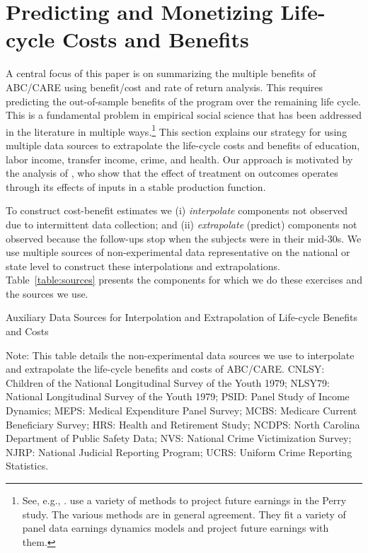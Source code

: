 \section{Predicting and Monetizing Life-cycle Costs and Benefits}\label{section:cbamethodology}

A central focus of this paper is on summarizing the multiple benefits of ABC/CARE using benefit/cost and rate of return analysis. This requires predicting the out-of-sample benefits of the program over the remaining life cycle. This is a fundamental problem in empirical social science that has been addressed in the literature in multiple ways.\footnote{See, e.g., \cite{Heckman_Lochner_ea_2006_HEE}. \citet{Heckman_Moon_etal_2010_RateofReturn} use a variety of methods to project future earnings in the Perry study. The various methods are in general agreement. They fit a variety of panel data earnings dynamics models and project future earnings with them.} This section explains our strategy for using multiple data sources to extrapolate the life-cycle costs and benefits of education, labor income, transfer income, crime, and health. Our approach is motivated by the analysis of \citet{Heckman_Pinto_etal_2013_PerryFactor}, who show that the effect of treatment on outcomes operates through its effects of inputs in a stable production function.

To construct cost-benefit estimates we (i) \textit{interpolate} components not observed due to intermittent data collection; and (ii) \textit{extrapolate} (predict) components not observed because the follow-ups stop when the subjects were in their mid-30s. We use multiple sources of non-experimental data representative on the national or state level to construct these interpolations and extrapolations. Table~\ref{table:sources} presents the components for which we do these exercises and the sources we use.

\begin{table}[!htbp]
\begin{threeparttable}
\caption{Auxiliary Data Sources for Interpolation and Extrapolation of Life-cycle Benefits and Costs} \label{table:sources}
\footnotesize

\begin{tablenotes}
\footnotesize
Note: This table details the non-experimental data sources we use to interpolate and extrapolate the life-cycle benefits and costs of ABC/CARE. CNLSY: Children of the National Longitudinal Survey of the Youth 1979; NLSY79: National Longitudinal Survey of the Youth 1979; PSID: Panel Study of Income Dynamics; MEPS: Medical Expenditure Panel Survey; MCBS: Medicare Current Beneficiary Survey; HRS: Health and Retirement Study; NCDPS: North Carolina Department of Public Safety Data; NVS: National Crime Victimization Survey; NJRP: National Judicial Reporting Program; UCRS: Uniform Crime Reporting Statistics.
\end{tablenotes}
\end{threeparttable}
\end{table}

